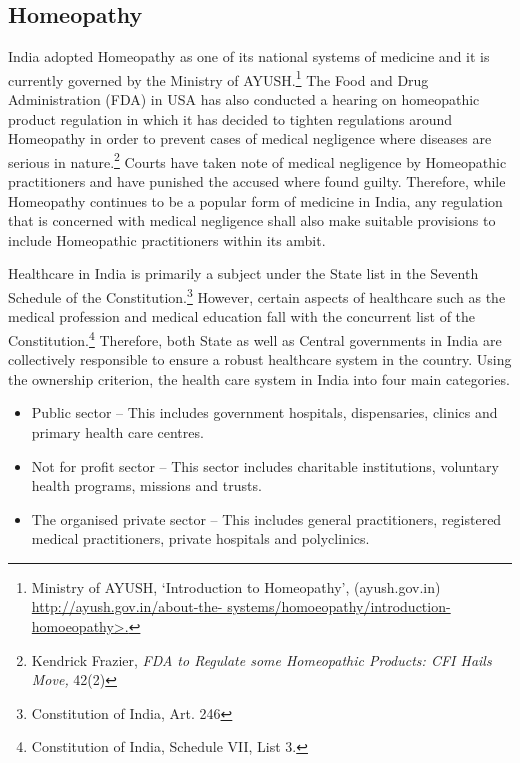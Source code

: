 \begin{multicols}{2}
\vspace{-.3cm}

\subsection*{Homeopathy}

\vspace{-.2cm}

\noi
India adopted Homeopathy as one of its national systems of medicine and it is currently governed by the Ministry of AYUSH.\footnote{Ministry of AYUSH, ‘Introduction to Homeopathy’, (ayush.gov.in) \url{http://ayush.gov.in/about-the- systems/homoeopathy/introduction-homoeopathy>.}} The Food and Drug Administration (FDA) in USA has also conducted a hearing on homeopathic product regulation in which it has decided to tighten regulations around Homeopathy in order to prevent cases of medical negligence where diseases are serious in nature.\footnote{Kendrick Frazier, \textit{FDA to Regulate some Homeopathic Products: CFI Hails Move,} 42(2)} Courts have taken note of medical negligence by Homeopathic practitioners and have punished the accused where found guilty. Therefore, while Homeopathy continues to be a popular form of medicine in India, any regulation that is concerned with medical negligence shall also make suitable provisions to include Homeopathic practitioners within its ambit.

\noi
Healthcare in India is primarily a subject under the State list in the Seventh Schedule of the Constitution.\footnote{Constitution of India, Art. 246} However, certain aspects of healthcare such as the medical profession and medical education fall with the concurrent list of the Constitution.\footnote{Constitution of India, Schedule VII, List 3.} Therefore, both State as well as Central governments in India are collectively responsible to ensure a robust healthcare system in the country. Using the ownership criterion, the health care system in India into four main categories.

\begin{itemize}
\itemsep=0pt
\item Public sector – This includes government hospitals, dispensaries, clinics and primary health care centres.

\item Not for profit sector – This sector includes charitable institutions, voluntary health programs, missions and trusts.

\item The organised private sector – This includes general practitioners, registered medical practitioners, private hospitals and polyclinics.


\end{itemize}
\end{multicols}
